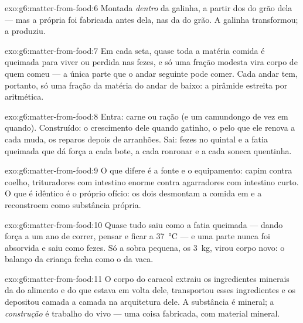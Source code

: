 \begin{solution}{exo:g6:matter-from-food:6}
Montada \emph{dentro} da galinha, a partir dos  do grão
dela --- mas a própria  foi fabricada antes dela, nas
 da  do grão. A galinha transformou; a  produziu.
\end{solution}

\begin{solution}{exo:g6:matter-from-food:7}
Em cada seta, quase toda a matéria comida é queimada para viver ou
perdida nas fezes, e só uma fração modesta vira corpo de quem comeu
--- a única parte que o andar seguinte pode comer. Cada andar tem,
portanto, só uma fração da matéria do andar de baixo: a pirâmide
estreita por aritmética.
\end{solution}

\begin{solution}{exo:g6:matter-from-food:8}
Entra: carne ou ração (e um camundongo de vez em quando). Construído:
o crescimento dele quando gatinho, o pelo que ele renova a cada muda,
os reparos depois de arranhões. Sai: fezes no quintal e a fatia
queimada que dá força a cada bote, a cada ronronar e a cada soneca
quentinha.
\end{solution}

\begin{solution}{exo:g6:matter-from-food:9}
O que difere é a fonte e o equipamento: capim contra coelho,
trituradores com intestino enorme contra agarradores com intestino
curto. O que é idêntico é o próprio ofício: os dois desmontam a
 comida em  e a reconstroem como substância
própria.
\end{solution}

\begin{solution}{exo:g6:matter-from-food:10}
Quase tudo saiu como a fatia queimada --- dando força a um ano de
correr, pensar e ficar a \qty{37}{\degreeCelsius} --- e uma parte
nunca foi absorvida e saiu como fezes. Só a sobra pequena, os
\qty{3}{kg}, virou corpo novo: o balanço da criança fecha como o da
vaca.
\end{solution}

\begin{solution}{exo:g6:matter-from-food:11}
O corpo do caracol extraiu os ingredientes minerais da  do
alimento e do que estava em volta dele, transportou esses
ingredientes e os depositou camada a camada na arquitetura dele. A
substância é mineral; a \emph{construção} é trabalho do  vivo
--- uma coisa fabricada, com material mineral.
\end{solution}

